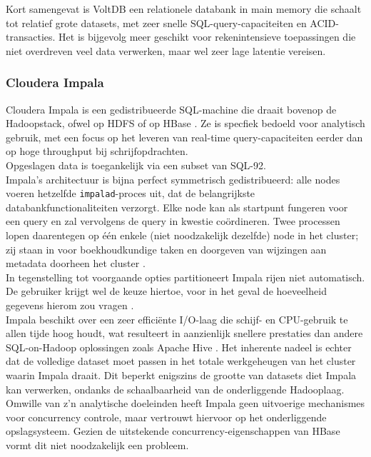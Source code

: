 Kort samengevat is VoltDB een relationele databank in main memory die schaalt tot relatief grote datasets, met zeer snelle SQL-query-capaciteiten en ACID-transacties. Het is bijgevolg meer geschikt voor rekenintensieve toepassingen die niet overdreven veel data verwerken, maar wel zeer lage latentie vereisen.

\subsubsection{Cloudera Impala}

Cloudera Impala is een gedistribueerde SQL-machine die draait bovenop de Hadoopstack, ofwel op HDFS of op HBase \cite{cloudera_impala}. Ze is specfiek bedoeld voor analytisch gebruik, met een focus op het leveren van real-time query-capaciteiten eerder dan op hoge throughput bij schrijfopdrachten.\\
Opgeslagen data is toegankelijk via een subset van SQL-92.\\
Impala's architectuur is bijna perfect symmetrisch gedistribueerd: alle nodes voeren hetzelfde \texttt{impalad}-proces uit, dat de belangrijkste databankfunctionaliteiten verzorgt. Elke node kan als startpunt fungeren voor een query en zal vervolgens de query in kwestie co\"ordineren. Twee processen lopen daarentegen op \'e\'en enkele (niet noodzakelijk dezelfde) node in het cluster; zij staan in voor boekhoudkundige taken en doorgeven van wijzingen aan metadata doorheen het cluster \cite{impala_components}.\\
In tegenstelling tot voorgaande opties partitioneert Impala rijen niet automatisch. De gebruiker krijgt wel de keuze hiertoe, voor in het geval de hoeveelheid gegevens hierom zou vragen \cite{impala_partitioning}.\\
Impala beschikt over een zeer effici\"ente I/O-laag die schijf- en CPU-gebruik te allen tijde hoog houdt, wat resulteert in aanzienlijk snellere prestaties dan andere SQL-on-Hadoop oplossingen zoals Apache Hive \cite{floratou2014sql}. Het inherente nadeel is echter dat de volledige dataset moet passen in het totale werkgeheugen van het cluster waarin Impala draait. Dit beperkt enigszins de grootte van datasets diet Impala kan verwerken, ondanks de schaalbaarheid van de onderliggende Hadooplaag.\\
Omwille van z'n analytische doeleinden heeft Impala geen uitvoerige mechanismes voor concurrency controle, maar vertrouwt hiervoor op het onderliggende opslagsysteem. Gezien de uitstekende concurrency-eigenschappen van HBase vormt dit niet noodzakelijk een probleem.
